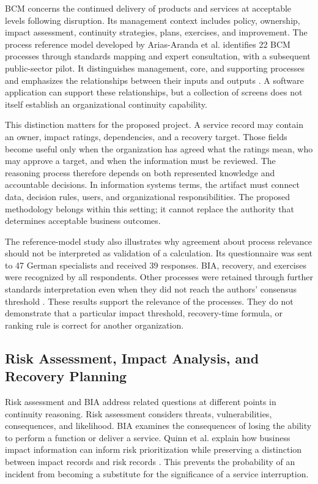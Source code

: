 BCM concerns the continued delivery of products and services at acceptable levels following disruption. Its management context includes policy, ownership, impact assessment, continuity strategies, plans, exercises, and improvement. The process reference model developed by Arias-Aranda et al. identifies 22 BCM processes through standards mapping and expert consultation, with a subsequent public-sector pilot. It distinguishes management, core, and supporting processes and emphasizes the relationships between their inputs and outputs \cite{reference2026processes}. A software application can support these relationships, but a collection of screens does not itself establish an organizational continuity capability.

This distinction matters for the proposed project. A service record may contain an owner, impact ratings, dependencies, and a recovery target. Those fields become useful only when the organization has agreed what the ratings mean, who may approve a target, and when the information must be reviewed. The reasoning process therefore depends on both represented knowledge and accountable decisions. In information systems terms, the artifact must connect data, decision rules, users, and organizational responsibilities. The proposed methodology belongs within this setting; it cannot replace the authority that determines acceptable business outcomes.

The reference-model study also illustrates why agreement about process relevance should not be interpreted as validation of a calculation. Its questionnaire was sent to 47 German specialists and received 39 responses. BIA, recovery, and exercises were recognized by all respondents. Other processes were retained through further standards interpretation even when they did not reach the authors' consensus threshold \cite{reference2026processes}. These results support the relevance of the processes. They do not demonstrate that a particular impact threshold, recovery-time formula, or ranking rule is correct for another organization.

\subsection{Risk Assessment, Impact Analysis, and Recovery Planning}

Risk assessment and BIA address related questions at different points in continuity reasoning. Risk assessment considers threats, vulnerabilities, consequences, and likelihood. BIA examines the consequences of losing the ability to perform a function or deliver a service. Quinn et al. explain how business impact information can inform risk prioritization while preserving a distinction between impact records and risk records \cite{quinn2025bia}. This prevents the probability of an incident from becoming a substitute for the significance of a service interruption.


